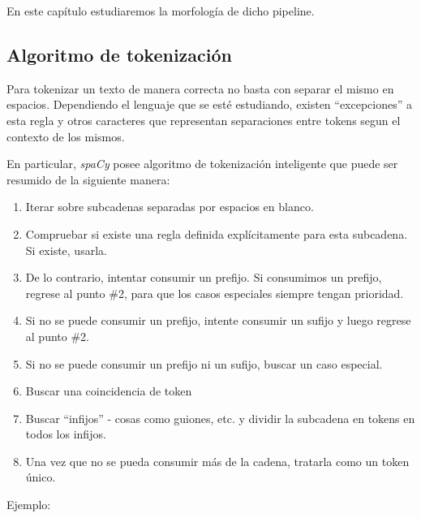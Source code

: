 \documentclass[12pt,a4paper,]{scrartcl}
\providecommand{\tightlist}{%
  \setlength{\itemsep}{0pt}\setlength{\parskip}{0pt}}
\begin{document}
En este capítulo estudiaremos la morfología de dicho pipeline.

\hypertarget{algoritmo-de-tokenizaciuxf3n}{%
\subsection{Algoritmo de tokenización}\label{algoritmo-de-tokenizaciuxf3n}}

Para tokenizar un texto de manera correcta no basta con separar el mismo en espacios. Dependiendo el lenguaje que se esté estudiando, existen \enquote{excepciones} a esta regla y otros caracteres que representan separaciones entre tokens segun el contexto de los mismos.

En particular, \emph{spaCy} posee algoritmo de tokenización inteligente que puede ser resumido de la siguiente manera:

\begin{enumerate}
\def\labelenumi{\arabic{enumi}.}
\tightlist
\item
  Iterar sobre subcadenas separadas por espacios en blanco.
\item
  Compruebar si existe una regla definida explícitamente para esta subcadena. Si existe, usarla.
\item
  De lo contrario, intentar consumir un prefijo. Si consumimos un prefijo, regrese al punto \#2, para que los casos especiales siempre tengan prioridad.
\item
  Si no se puede consumir un prefijo, intente consumir un sufijo y luego regrese al punto \#2.
\item
  Si no se puede consumir un prefijo ni un sufijo, buscar un caso especial.
\item
  Buscar una coincidencia de token
\item
  Buscar \enquote{infijos} - cosas como guiones, etc. y dividir la subcadena en tokens en todos los infijos.
\item
  Una vez que no se pueda consumir más de la cadena, tratarla como un token único.
\end{enumerate}

Ejemplo:
\end{document}
